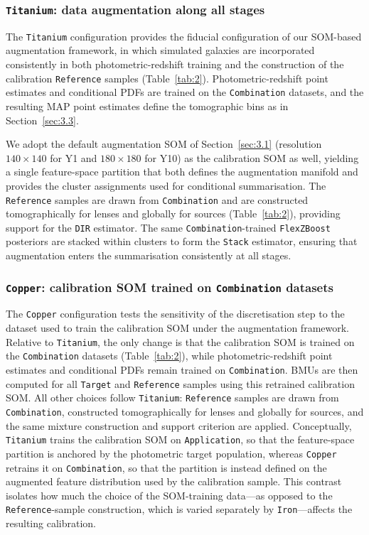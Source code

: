 \subsubsection{\texttt{Titanium}: data augmentation along all stages} \label{sec:3.4.3}

The \texttt{Titanium} configuration provides the fiducial configuration of our SOM-based augmentation framework, in which simulated galaxies are incorporated consistently in both photometric-redshift training and the construction of the calibration \texttt{Reference} samples (Table~\ref{tab:2}). Photometric-redshift point estimates and conditional PDFs are trained on the \texttt{Combination} datasets, and the resulting MAP point estimates define the tomographic bins as in Section~\ref{sec:3.3}.

We adopt the default augmentation SOM of Section~\ref{sec:3.1} (resolution \(140 \times 140\) for Y1 and \(180 \times 180\) for Y10) as the calibration SOM as well, yielding a single feature-space partition that both defines the augmentation manifold and provides the cluster assignments used for conditional summarisation. The \texttt{Reference} samples are drawn from \texttt{Combination} and are constructed tomographically for lenses and globally for sources (Table~\ref{tab:2}), providing support for the \texttt{DIR} estimator. The same \texttt{Combination}-trained \texttt{FlexZBoost} posteriors are stacked within clusters to form the \texttt{Stack} estimator, ensuring that augmentation enters the summarisation consistently at all stages.

\subsubsection{\texttt{Copper}: calibration SOM trained on \texttt{Combination} datasets} \label{sec:3.4.4}

The \texttt{Copper} configuration tests the sensitivity of the discretisation step to the dataset used to train the calibration SOM under the augmentation framework. Relative to \texttt{Titanium}, the only change is that the calibration SOM is trained on the \texttt{Combination} datasets (Table~\ref{tab:2}), while photometric-redshift point estimates and conditional PDFs remain trained on \texttt{Combination}. BMUs are then computed for all \texttt{Target} and \texttt{Reference} samples using this retrained calibration SOM. All other choices follow \texttt{Titanium}: \texttt{Reference} samples are drawn from \texttt{Combination}, constructed tomographically for lenses and globally for sources, and the same mixture construction and support criterion are applied. Conceptually, \texttt{Titanium} trains the calibration SOM on \texttt{Application}, so that the feature-space partition is anchored by the photometric target population, whereas \texttt{Copper} retrains it on \texttt{Combination}, so that the partition is instead defined on the augmented feature distribution used by the calibration sample. This contrast isolates how much the choice of the SOM-training data---as opposed to the \texttt{Reference}-sample construction, which is varied separately by \texttt{Iron}---affects the resulting calibration.

